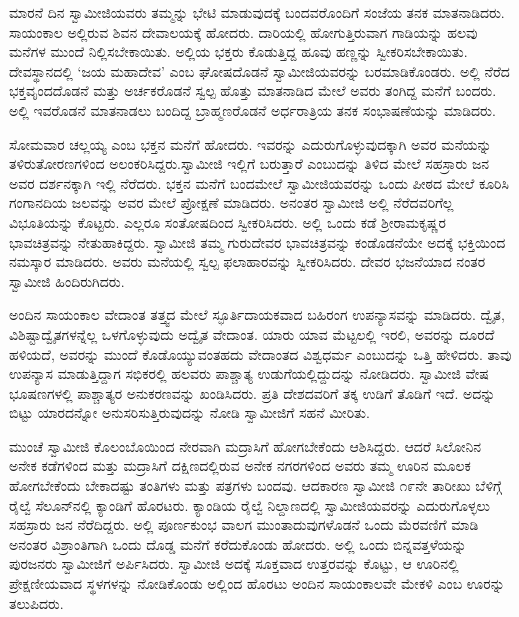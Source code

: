  ಮಾರನೆ ದಿನ ಸ್ವಾಮೀಜಿಯವರು ತಮ್ಮನ್ನು ಭೇಟಿ ಮಾಡುವುದಕ್ಕೆ ಬಂದವರೊಂದಿಗೆ ಸಂಜೆಯ ತನಕ ಮಾತನಾಡಿದರು. ಸಾಯಂಕಾಲ ಅಲ್ಲಿರುವ ಶಿವನ ದೇವಾಲಯಕ್ಕೆ ಹೋದರು. ದಾರಿಯಲ್ಲಿ ಹೋಗುತ್ತಿರುವಾಗ ಗಾಡಿಯನ್ನು ಹಲವು ಮನೆಗಳ ಮುಂದೆ ನಿಲ್ಲಿಸಬೇಕಾಯಿತು. ಅಲ್ಲಿಯ ಭಕ್ತರು ಕೊಡುತ್ತಿದ್ದ ಹೂವು ಹಣ್ಣನ್ನು ಸ್ವೀಕರಿಸಬೇಕಾಯಿತು. ದೇವಸ್ಥಾನದಲ್ಲಿ ‘ಜಯ ಮಹಾದೇವ’ ಎಂಬ ಘೋಷದೊಡನೆ ಸ್ವಾಮೀಜಿಯವರನ್ನು ಬರಮಾಡಿಕೊಂಡರು. ಅಲ್ಲಿ ನೆರೆದ ಭಕ್ತವೃಂದದೊಡನೆ ಮತ್ತು ಅರ್ಚಕರೊಡನೆ ಸ್ವಲ್ಪ ಹೊತ್ತು ಮಾತನಾಡಿದ ಮೇಲೆ ಅವರು ತಂಗಿದ್ದ ಮನೆಗೆ ಬಂದರು. ಅಲ್ಲಿ ಇವರೊಡನೆ ಮಾತನಾಡಲು ಬಂದಿದ್ದ ಬ್ರಾಹ್ಮಣರೊಡನೆ ಅರ್ಧರಾತ್ರಿಯ ತನಕ ಸಂಭಾಷಣೆಯನ್ನು ಮಾಡಿದರು. 

 ಸೋಮವಾರ ಚಲ್ಲಯ್ಯ ಎಂಬ ಭಕ್ತನ ಮನೆಗೆ ಹೋದರು. ಇವರನ್ನು ಎದುರುಗೊಳ್ಳುವುದಕ್ಕಾಗಿ ಅವರ ಮನೆಯನ್ನು ತಳಿರುತೋರಣಗಳಿಂದ ಅಲಂಕರಿಸಿದ್ದರು.\break ಸ್ವಾಮೀಜಿ ಇಲ್ಲಿಗೆ ಬರುತ್ತಾರೆ ಎಂಬುದನ್ನು ತಿಳಿದ ಮೇಲೆ ಸಹಸ್ರಾರು ಜನ ಅವರ ದರ್ಶನಕ್ಕಾಗಿ ಇಲ್ಲಿ ನೆರೆದರು. ಭಕ್ತನ ಮನೆಗೆ ಬಂದಮೇಲೆ ಸ್ವಾಮೀಜಿಯವರನ್ನು ಒಂದು ಪೀಠದ ಮೇಲೆ ಕೂರಿಸಿ ಗಂಗಾನದಿಯ ಜಲವನ್ನು ಅವರ ಮೇಲೆ ಪ್ರೋಕ್ಷಣೆ ಮಾಡಿದರು. ಅನಂತರ ಸ್ವಾಮೀಜಿ ಅಲ್ಲಿ ನೆರೆದವರಿಗೆಲ್ಲ ವಿಭೂತಿಯನ್ನು ಕೊಟ್ಟರು. ಎಲ್ಲರೂ ಸಂತೋಷದಿಂದ ಸ್ವೀಕರಿಸಿದರು. ಅಲ್ಲಿ ಒಂದು ಕಡೆ ಶ‍್ರೀರಾಮಕೃಷ್ಣರ ಭಾವಚಿತ್ರವನ್ನು ನೇತುಹಾಕಿದ್ದರು. ಸ್ವಾಮೀಜಿ ತಮ್ಮ ಗುರುದೇವರ ಭಾವಚಿತ್ರವನ್ನು ಕಂಡೊಡನೆಯೇ ಅದಕ್ಕೆ ಭಕ್ತಿಯಿಂದ ನಮಸ್ಕಾರ ಮಾಡಿದರು. ಅವರು ಮನೆಯಲ್ಲಿ ಸ್ವಲ್ಪ ಫಲಾಹಾರವನ್ನು ಸ್ವೀಕರಿಸಿದರು. ದೇವರ ಭಜನೆಯಾದ ನಂತರ ಸ್ವಾಮೀಜಿ ಹಿಂದಿರುಗಿದರು. 

 ಅಂದಿನ ಸಾಯಂಕಾಲ ವೇದಾಂತ ತತ್ತ್ವದ ಮೇಲೆ ಸ್ಫೂರ್ತಿದಾಯಕವಾದ ಬಹಿರಂಗ ಉಪನ್ಯಾಸವನ್ನು ಮಾಡಿದರು. ದ್ವೈತ, ವಿಶಿಷ್ಟಾದ್ವೈತಗಳನ್ನೆಲ್ಲ ಒಳಗೊಳ್ಳುವುದು ಅದ್ವೈತ ವೇದಾಂತ. ಯಾರು ಯಾವ ಮೆಟ್ಟಲಲ್ಲಿ ಇರಲಿ, ಅವರನ್ನು ದೂರದೆ ಹಳಿಯದೆ, ಅವರನ್ನು ಮುಂದೆ ಕೊಡೊಯ್ಯುವಂತಹದು ವೇದಾಂತದ ವಿಶ್ವಧರ್ಮ ಎಂಬುದನ್ನು ಒತ್ತಿ ಹೇಳಿದರು. ತಾವು ಉಪನ್ಯಾಸ ಮಾಡುತ್ತಿದ್ದಾಗ ಸಭಿಕರಲ್ಲಿ ಹಲವರು ಪಾಶ್ಚಾತ್ಯ ಉಡುಗೆಯಲ್ಲಿದ್ದುದನ್ನು ನೋಡಿದರು. ಸ್ವಾಮೀಜಿ ವೇಷ ಭೂಷಣಗಳಲ್ಲಿ ಪಾಶ್ಚಾತ್ಯರ ಅನುಕರಣವನ್ನು ಖಂಡಿಸಿದರು. ಪ್ರತಿ ದೇಶದವರಿಗೆ ತಕ್ಕ ಉಡಿಗೆ ತೊಡಿಗೆ ಇದೆ. ಅದನ್ನು ಬಿಟ್ಟು ಯಾರದನ್ನೋ ಅನುಸರಿಸುತ್ತಿರುವುದನ್ನು ನೋಡಿ ಸ್ವಾಮೀಜಿಗೆ ಸಹನೆ ಮೀರಿತು. 

 ಮುಂಚೆ ಸ್ವಾಮೀಜಿ ಕೊಲಂಬೊಯಿಂದ ನೇರವಾಗಿ ಮದ್ರಾಸಿಗೆ ಹೋಗಬೇಕೆಂದು ಆಶಿಸಿದ್ದರು. ಆದರೆ ಸಿಲೋನಿನ ಅನೇಕ ಕಡೆಗಳಿಂದ ಮತ್ತು ಮದ್ರಾಸಿಗೆ ದಕ್ಷಿಣದಲ್ಲಿರುವ ಅನೇಕ ನಗರಗಳಿಂದ ಅವರು ತಮ್ಮ ಊರಿನ ಮೂಲಕ ಹೋಗಬೇಕೆಂದು ಬೇಕಾದಷ್ಟು ತಂತಿಗಳು ಮತ್ತು ಪತ್ರಗಳು ಬಂದವು. ಆದಕಾರಣ ಸ್ವಾಮೀಜಿ ೧೯ನೇ ತಾರೀಖು ಬೆಳಿಗ್ಗೆ ರೈಲ್ವೆ ಸೆಲೂನ್‍ನಲ್ಲಿ ಕ್ಯಾಂಡಿಗೆ ಹೊರಟರು. ಕ್ಯಾಂಡಿಯ ರೈಲ್ವೆ ನಿಲ್ದಾಣದಲ್ಲಿ ಸ್ವಾಮೀಜಿಯವರನ್ನು ಎದುರುಗೊಳ್ಳಲು ಸಹಸ್ರಾರು ಜನ ನೆರೆದಿದ್ದರು. ಅಲ್ಲಿ ಪೂರ್ಣಕುಂಭ ವಾಲಗ ಮುಂತಾದುವುಗಳೊಡನೆ ಒಂದು ಮೆರವಣಿಗೆ ಮಾಡಿ ಅನಂತರ ವಿಶ್ರಾಂತಿಗಾಗಿ ಒಂದು ದೊಡ್ಡ ಮನೆಗೆ ಕರೆದುಕೊಂಡು ಹೋದರು. ಅಲ್ಲಿ ಒಂದು ಬಿನ್ನವತ್ತಳೆಯನ್ನು ಪುರಜನರು ಸ್ವಾಮೀಜಿಗೆ ಅರ್ಪಿಸಿದರು. ಸ್ವಾಮೀಜಿ ಅದಕ್ಕೆ ಸೂಕ್ತವಾದ ಉತ್ತರವನ್ನು ಕೊಟ್ಟು, ಆ ಊರಿನಲ್ಲಿ ಪ್ರೇಕ್ಷಣೀಯವಾದ ಸ್ಥಳಗಳನ್ನು ನೋಡಿಕೊಂಡು ಅಲ್ಲಿಂದ ಹೊರಟು ಅಂದಿನ ಸಾಯಂಕಾಲವೇ ಮೇಕಳಿ ಎಂಬ ಊರನ್ನು ತಲುಪಿದರು. 

